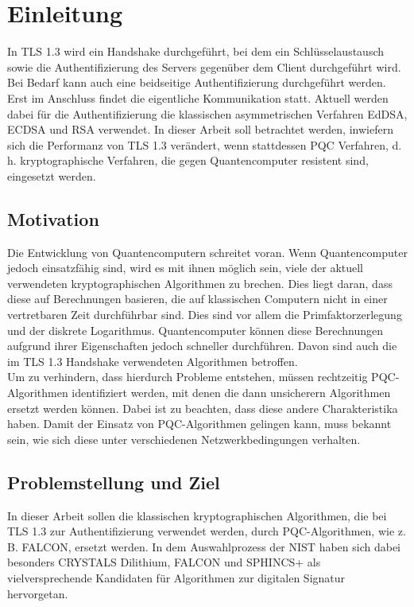 \chapter{Einleitung}
\label{ch:einleitung}

In \ac{TLS} 1.3 wird ein Handshake durchgeführt, bei dem ein Schlüsselaustausch sowie die Authentifizierung des Servers gegenüber dem Client durchgeführt wird. Bei Bedarf kann auch eine beidseitige Authentifizierung durchgeführt werden. Erst im Anschluss findet die eigentliche Kommunikation statt. Aktuell werden dabei für die Authentifizierung die klassischen asymmetrischen Verfahren \ac{EdDSA}, \ac{ECDSA} und \ac{RSA} verwendet. In dieser Arbeit soll betrachtet werden, inwiefern sich die Performanz von TLS 1.3 verändert, wenn stattdessen \ac{PQC} Verfahren, d. h. kryptographische Verfahren, die gegen Quantencomputer resistent sind, eingesetzt werden.

	\section{Motivation}
	\label{sec:einleitung:motivation}

	Die Entwicklung von Quantencomputern schreitet voran. Wenn Quantencomputer jedoch einsatzfähig sind, wird es mit ihnen möglich sein, viele der aktuell verwendeten kryptographischen Algorithmen zu brechen. Dies liegt daran, dass diese auf Berechnungen basieren, die auf klassischen Computern nicht in einer vertretbaren Zeit durchführbar sind. Dies sind vor allem die Primfaktorzerlegung und der diskrete Logarithmus. Quantencomputer können diese Berechnungen aufgrund ihrer Eigenschaften jedoch schneller durchführen. Davon sind auch die im TLS 1.3 Handshake verwendeten Algorithmen betroffen.\\

	Um zu verhindern, dass hierdurch Probleme entstehen, müssen rechtzeitig PQC-Algorithmen identifiziert werden, mit denen die dann unsicherern Algorithmen ersetzt werden können. Dabei ist zu beachten, dass diese andere Charakteristika haben. Damit der Einsatz von PQC-Algorithmen gelingen kann, muss bekannt sein, wie sich diese unter verschiedenen Netzwerkbedingungen verhalten.

	\section{Problemstellung und Ziel}
	\label{sec:einleitung:problemstellung}

	In dieser Arbeit sollen die klassischen kryptographischen Algorithmen, die bei TLS 1.3 zur Authentifizierung verwendet werden, durch PQC-Algorithmen, wie z. B. \ac{FALCON}, ersetzt werden. In dem Auswahlprozess der \ac{NIST} haben sich dabei besonders \ac{CRYSTALS} Dilithium, FALCON und SPHINCS+ als vielversprechende Kandidaten für Algorithmen zur digitalen Signatur hervorgetan.\\
	
